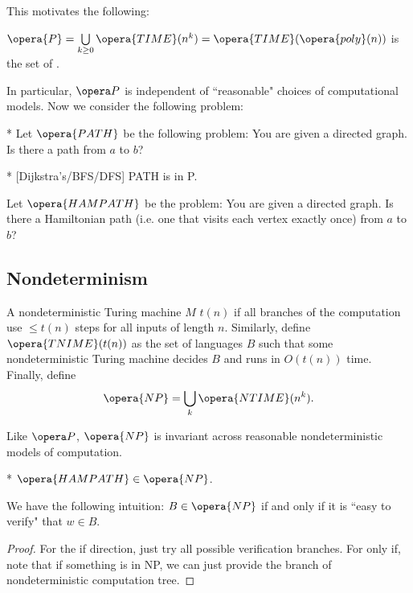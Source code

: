 This motivates the following:

\begin{defn}
	$\opera{P} = \bigcup\limits_{k\geq 0} \opera{TIME}(n^k) = \opera{TIME}(\opera{poly}(n))$ is the set of .
\end{defn}

In particular, $\opera P$ is independent of ``reasonable" choices of computational models.
Now we consider the following problem:

\begin{defn}*
	Let $\opera{PATH}$ be the following problem: You are given a directed graph. Is there a path from $a$ to $b$?
\end{defn}

\begin{fact}*
	[Dijkstra's/BFS/DFS]
	PATH is in P.
\end{fact}

\begin{defn}
	Let $\opera{HAMPATH}$ be the  problem: You are given a directed graph. Is there a Hamiltonian path (i.e. one that visits each vertex exactly once) from $a$ to $b$?
\end{defn}

\subsection{Nondeterminism}

\begin{defn}
	A nondeterministic Turing machine $M$  $t(n)$ if all branches of the computation use $\leq t(n)$ steps for all inputs of length $n$.
	Similarly, define $\opera{TNIME}(t(n))$ as the set of languages $B$ such that some nondeterministic Turing machine decides $B$ and runs in $O(t(n))$ time.
	Finally, define \[
		\opera{NP} = \bigcup_k \opera{NTIME} (n^k).
	\]
\end{defn}

\begin{fact}
	Like $\opera P$, $\opera{NP}$ is invariant across reasonable nondeterministic models of computation.
\end{fact}

\begin{fact}*
	$\opera{HAMPATH}\in \opera{NP}$.
\end{fact}

\begin{fact}
	We have the following intuition: $B\in \opera{NP}$ if and only if it is ``easy to verify" that $w\in B$.
\end{fact}

\begin{proof}
	For the if direction, just try all possible verification branches. For only if, note that if something is in NP, we can just provide the branch of nondeterministic computation tree.
\end{proof}
